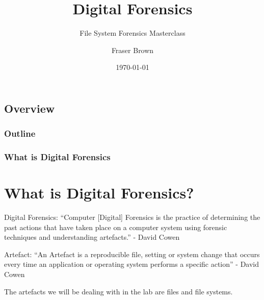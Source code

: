 \documentclass{beamer}
\title{Digital Forensics}
\subtitle{File System Forensics Masterclass}
\author{Fraser Brown}
\institute{Heriot-Watt University}
\date{\today}
\begin{document}
\begin{frame}
\titlepage
\end{frame}

\begin{frame}[shrink]
\section{Overview}
\frametitle{Outline}
\tableofcontents
\end{frame}

\begin{frame}
	\frametitle{What is Digital Forensics}
	\section{What is Digital Forensics?}
	\begin{block}{Digital Forensics:}
		``Computer [Digital] Forensics is the practice of determining the past actions that have taken place on a computer system using forensic techniques and understanding artefacts.'' - David Cowen
	\end{block}
		
	\begin{block}{Artefact:}
		``An Artefact is a reproducible file, setting or system change that occurs every time an application or operating system performs a specific action'' - David Cowen
	\end{block}

	The artefacts we will be dealing with in the lab are files and file systems.
\end{frame}
\end{document}
